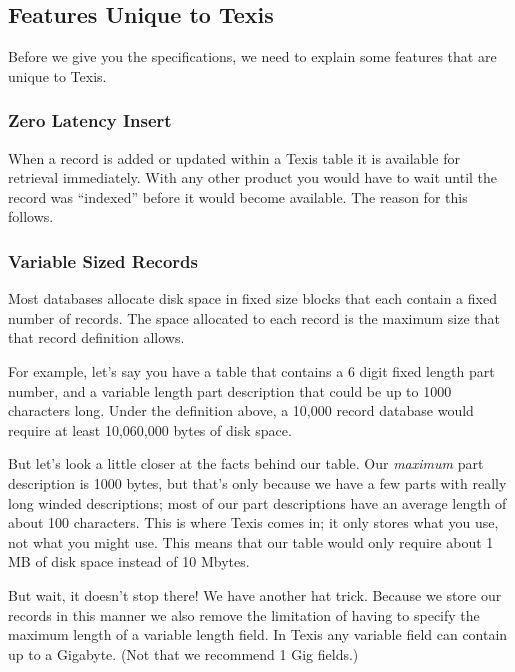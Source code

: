 \subsection{Features Unique to Texis}

Before we give you the specifications, we need to explain some
features that are unique to Texis.

\subsubsection{Zero Latency Insert}

When a record is added or updated within a Texis table it is available
for retrieval immediately.  With any other product you would have to
wait until the record was ``indexed'' before it would become
available.  The reason for this follows.

\subsubsection{Variable Sized Records}

Most databases allocate disk space in fixed size blocks that each
contain a fixed number of records.  The space allocated to each record
is the maximum size that that record definition allows.

For example, let's say you have a table that contains a 6 digit fixed
length part number, and a variable length part description that could
be up to 1000 characters long.  Under the definition above, a 10,000
record database would require at least 10,060,000 bytes of disk space.

But let's look a little closer at the facts behind our table.  Our
{\em maximum} part description is 1000 bytes, but that's only because
we have a few parts with really long winded descriptions; most of our
part descriptions have an average length of about 100 characters.
This is where Texis comes in; it only stores what you use, not what
you might use.  This means that our table would only require about 1
MB of disk space instead of 10 Mbytes.

But wait, it doesn't stop there!  We have another hat trick.  Because
we store our records in this manner we also remove the limitation of
having to specify the maximum length of a variable length field.  In
Texis any variable field can contain up to a Gigabyte.  (Not that we
recommend 1 Gig fields.)

